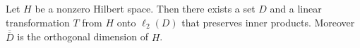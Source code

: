 Let $H$ be a nonzero Hilbert space. Then there exists a set $D$ and a linear transformation $T$ from $H$ onto $\ell_2(D)$ that preserves inner products. Moreover $\overline{\overline{D}}$ is the orthogonal dimension of $H$.
